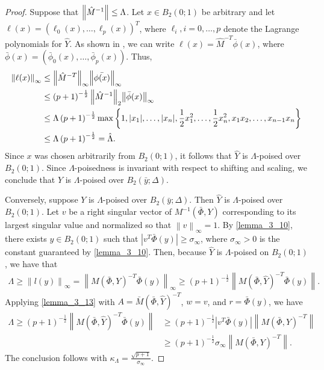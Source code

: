\documentclass{article}
\begin{document}
\begin{proof}
Suppose that ${\left\|\hat{M}^{-1}\right\|} \le \Lambda$.    
Let $x \in B_2(0;1)$ be arbitrary and let $\ell(x) = (\ell_0(x), \ldots, \ell_p(x))^T$, where $\ell_i, i=0,\ldots,p$ denote the Lagrange polynomials for $\hat{Y}$.
As shown in \cite{introduction_book}, we can write $\ell(x) = \hat{M}^{-T}\bar{\phi}(x)$, 
where $\bar{\phi}(x) = (\bar{\phi}_0(x), \ldots, \bar{\phi}_p(x))$.
Thus,
\begin{align*}
{\left\|\ell(x)\right\|}_{\infty} & \le {\left\|\hat{M}^{-T}\right\|}_{\infty} {\left\|\bar{\phi(x)}\right\|}_{\infty} \\
& \le \left(p+1\right)^{-\frac 1 2} {\left\|\hat{M}^{-1}\right\|}_2 {\left\|\bar{\phi}(x)\right\|}_{\infty} \\
& \le \Lambda \left(p+1\right)^{-\frac 1 2} \max\left\{1, |x_1|, \ldots,|x_n|, \frac 1 2 x_1^2, \ldots, \frac 1 2 x_n^2, x_1x_2, \ldots, x_{n-1}x_n\right\}\\
& \le \Lambda \left(p+1\right)^{-\frac 1 2}   = \hat{\Lambda}.
\end{align*}
Since $x$ was chosen arbitrarily from $B_2(0;1)$, it follows that $\hat{Y}$ is $\Lambda$-poised over $B_2(0;1)$.   Since $\Lambda$-poisedness is invariant with respect to shifting and scaling,  we conclude that $Y$ is $\Lambda$-poised over $B_2(\bar{y};\Delta)$.

Conversely, suppose $Y$ is $\Lambda$-poised over $B_2(\bar{y};\Delta)$.  Then $\hat{Y}$ is $\Lambda$-poised over $B_2(0;1)$.    Let $v$ be a right singular vector of $M^{-1}\left(\bar \Phi, Y\right)$ 
corresponding to its largest singular value and normalized so that $\left\|v\right\|_{\infty} = 1$.    By \cref{lemma_3_10},  there exists $y \in B_2\left(0; 1\right)$ such that
$\left| v^T \bar {\Phi}(y) \right| \ge {\sigma_{\infty}}$, where $\sigma_{\infty} > 0$ is the constant guaranteed by \cref{lemma_3_10}.
Then, because $\hat Y$ is $\Lambda$-poised on $B_2(0; 1)$, we have that 
\begin{align*}
\Lambda 
\ge \left\|l(y)\right\|_{\infty} 
= \left\|M\left(\bar \Phi, Y\right)^{-T} \bar \Phi(y)\right\|_{\infty}
\ge \left(p+1\right)^{-\frac1 2 }\left\|M\left(\bar \Phi, \hat Y\right)^{-T} \bar{\Phi}(y)\right\|.
\end{align*}
Applying \cref{lemma_3_13} with $A = {\bar M}\left(\bar \Phi, \hat Y\right)^{-T}$, $w = v$, and $r = \bar \Phi(y)$, we have
\begin{align*}
\Lambda 
\ge \left(p+1\right)^{-\frac1 2 }\left\|M\left(\bar \Phi, \hat Y\right)^{-T} \bar{\Phi}(y)\right\|
&\ge \left(p+1\right)^{-\frac1 2 }|v^T \bar \Phi(y)| \left\|M\left(\bar \Phi, Y\right)^{-T}\right\| \\
&\ge \left(p+1\right)^{-\frac1 2 }\sigma_{\infty} \left\|M\left(\bar \Phi, Y\right)^{-T}\right\|.
\end{align*}
The conclusion follows with $\kappa_{\Lambda} = \frac {\sqrt{p+1}}{\sigma_{\infty}}$.
\end{proof}
\end{document}
